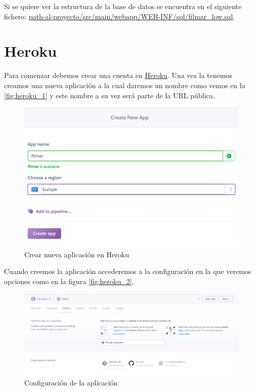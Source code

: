 Si se quiere ver la estructura de la base de datos se encuentra en 
el siguiente fichero: \url{path-al-proyecto/src/main/webapp/WEB-INF/sql/filmar_low.sql}.

\section{Heroku}
\label{app:heroku}
Para comenzar debemos crear una cuenta en \href{https://www.heroku.com/}{Heroku}.
Una vez la tenemos creamos una nueva aplicación a la
 cual daremos un nombre como vemos en la \autoref{fig:heroku_1} y este
 nombre a su vez será parte de la URL pública.
\begin{figure}[H]
    \centering
    \includegraphics[width=6in]{figures/appendix-A/heroku_1.png}
    \caption{Crear nueva aplicación en Heroku}
    \label{fig:heroku_1}
\end{figure}
Cuando creemos la aplicación accederemos a la configuración en la que veremos
 opciones como en la figura \autoref{fig:heroku_2}.
\begin{figure}[H]
    \centering
    \includegraphics[width=6in]{figures/appendix-A/heroku_2.png}
    \caption{Configuración de la aplicación}
    \label{fig:heroku_2}
\end{figure}
